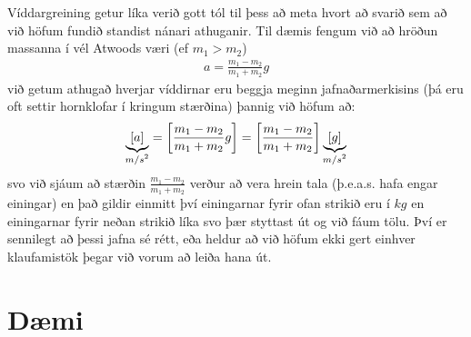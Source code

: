 Víddargreining getur líka verið gott tól til þess að meta hvort að svarið sem að við höfum fundið standist nánari athuganir. Til dæmis fengum við að hröðun massanna í vél Atwoods væri (ef $m_1 > m_2$)
\begin{align*}
    a = \frac{m_1 - m_2}{m_1 + m_2}g
\end{align*}
við getum athugað hverjar víddirnar eru beggja meginn jafnaðarmerkisins (þá eru oft settir hornklofar í kringum stærðina) þannig við höfum að:
\begin{align*}
   \underbrace{ \left[ a \right]}_\textrm{$m/s^2$} = \left[ \frac{m_1 - m_2}{m_1 + m_2}g  \right] = \left[ \frac{m_1 - m_2}{m_1 + m_2} \right] \underbrace{\left[ g \right]}_\textrm{$m/s^2$}
\end{align*}
svo við sjáum að stærðin $\frac{m_1 - m_2}{m_1 + m_2}$ verður að vera hrein tala (þ.e.a.s. hafa engar einingar) en það gildir einmitt því einingarnar fyrir ofan strikið eru í $\si{kg}$ en einingarnar fyrir neðan strikið líka svo þær styttast út og við fáum tölu. Því er sennilegt að þessi jafna sé rétt, eða heldur að við höfum ekki gert einhver klaufamistök þegar við vorum að leiða hana út. \\


\newpage

\section{Dæmi}


